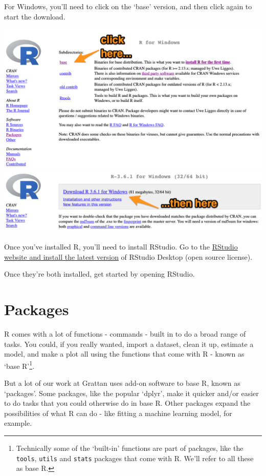\documentclass[]{book}
\let\rmarkdownfootnote\footnote%
\def\footnote{\protect\rmarkdownfootnote}
\begin{document}
For Windows, you'll need to click on the `base' version, and then click again to start the download.

\includegraphics[width=15.69in]{atlas/r_cran_windows_1}
\includegraphics[width=15.67in]{atlas/r_cran_windows_2}

Once you've installed R, you'll need to install RStudio. Go to the \href{https://www.rstudio.com/products/rstudio/download/\#download}{RStudio website and install the latest version} of RStudio Desktop (open source license).

Once they're both installed, get started by opening RStudio.

\hypertarget{packages}{%
\section{Packages}\label{packages}}

R comes with a lot of functions - commands - built in to do a broad range of tasks. You could, if you really wanted, import a dataset, clean it up, estimate a model, and make a plot all using the functions that come with R - known as `base R'\footnote{Technically some of the `built-in' functions are part of packages, like the \texttt{tools}, \texttt{utils} and \texttt{stats} packages that come with R. We'll refer to all these as base R.}.

But a lot of our work at Grattan uses add-on software to base R, known as `packages'. Some packages, like the popular `dplyr', make it quicker and/or easier to do tasks that you could otherwise do in base R. Other packages expand the possibilities of what R can do - like fitting a machine learning model, for example.
\end{document}
